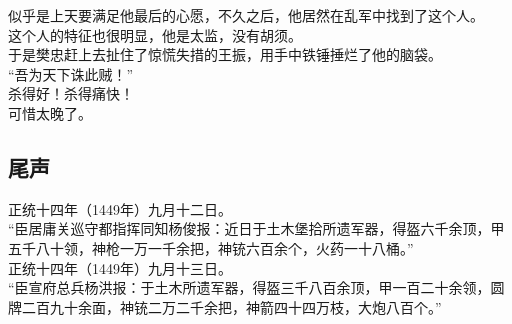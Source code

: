 \begin{multicols}{\theparacolNo}
似乎是上天要满足他最后的心愿，不久之后，他居然在乱军中找到了这个人。\\

这个人的特征也很明显，他是太监，没有胡须。\\

于是樊忠赶上去扯住了惊慌失措的王振，用手中铁锤捶烂了他的脑袋。\\

“吾为天下诛此贼！”\\

杀得好！杀得痛快！\\

可惜太晚了。\\

\subsection{尾声}
正统十四年（1449年）九月十二日。\\

“臣居庸关巡守都指挥同知杨俊报：近日于土木堡拾所遗军器，得盔六千余顶，甲五千八十领，神枪一万一千余把，神铳六百余个，火药一十八桶。”\\

正统十四年（1449年）九月十三日。\\

“臣宣府总兵杨洪报：于土木所遗军器，得盔三千八百余顶，甲一百二十余领，圆牌二百九十余面，神铳二万二千余把，神箭四十四万枝，大炮八百个。”\\
\ifnum{}
	\end{multicols}
\fi
\newpage
